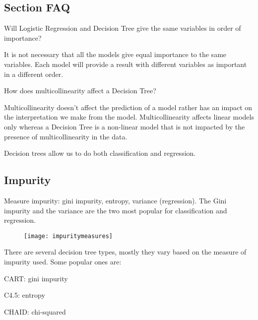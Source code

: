 	\subsection{Section FAQ}
    \begin{qanda}
		\begin{question}
Will Logistic Regression and Decision Tree give the same variables in order of importance?
		\end{question}

		\begin{answer}
It is not necessary that all the models give equal importance to the same variables. Each model will provide a result with different variables as important in a different order.
		\end{answer}
    \end{qanda}

    \begin{qanda}
		\begin{question}
How does multicollinearity affect a Decision Tree?
		\end{question}

		\begin{answer}
Multicollinearity doesn't affect the prediction of a model rather has an impact on the interpretation we make from the model. Multicollinearity affects linear models only whereas a Decision Tree is a non-linear model that is not impacted by the presence of multicollinearity in the data.
		\end{answer}
    \end{qanda}


Decision trees allow us to do both classification and regression.

	\subsection{Impurity}
Measure impurity: gini impurity, entropy, variance (regression).  The Gini impurity and the variance are the two most popular for classification and regression.

	\begin{figure}[tbp]
		\centering
		\texttt{[image: impuritymeasures]}
	\end{figure}

There are several decision tree types, mostly they vary based on the measure of impurity used.  Some popular ones are:
	\begin{bulletedlist}
		\item CART: gini impurity
		\item C4.5: entropy
		\item CHAID: chi-squared
	\end{bulletedlist}


